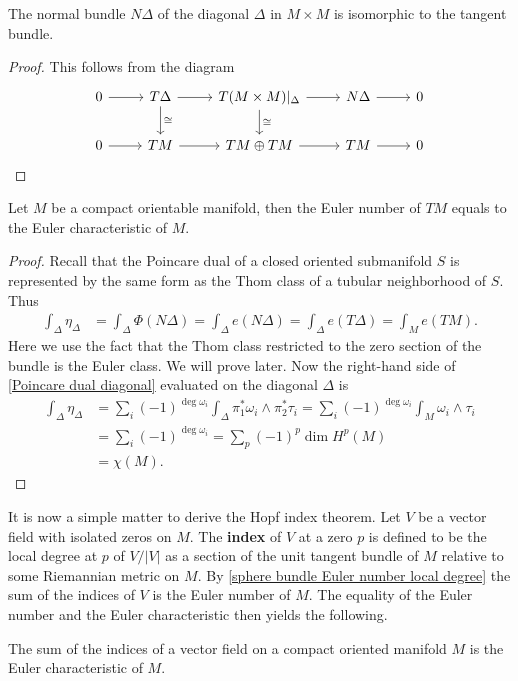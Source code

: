 \begin{lemma}
The normal bundle $N\Delta$ of the diagonal $\Delta$ in $M\times M$ is isomorphic to the tangent bundle.
\end{lemma}
\begin{proof}
This follows from the diagram
\[\begin{tikzcd}
0\ar[r]&T\Delta\ar[r]\ar[d,"\cong"]&T(M\times M)|_{\Delta}\ar[r]\ar[d,"\cong"]&N\Delta\ar[r]&0\\
0\ar[r]&TM\ar[r]&TM\oplus TM\ar[r]&TM\ar[r]&0
\end{tikzcd}\]
\end{proof}
\begin{theorem}\label{Euler number Euler char}
Let $M$ be a compact orientable manifold, then the Euler number of $TM$ equals to the Euler characteristic of $M$.
\end{theorem}
\begin{proof}
Recall that the Poincare dual of a closed oriented submanifold $S$ is represented by the same form as the Thom class of a tubular neighborhood of $S$. Thus
\begin{align*}
\int_{\Delta}\eta_{\Delta}&=\int_{\Delta}\Phi(N\Delta)=\int_{\Delta}e(N\Delta)=\int_{\Delta}e(T\Delta)=\int_Me(TM).
\end{align*}
Here we use the fact that the Thom class restricted to the zero section of the bundle is the Euler class. We will prove later. Now the right-hand side of 
\cref{Poincare dual diagonal} evaluated on the diagonal $\Delta$ is
\begin{align*}
\int_\Delta\eta_{\Delta}&=\sum_i(-1)^{\deg\omega_i}\int_{\Delta}\pi_1^*\omega_i\wedge\pi_2^*\tau_i=\sum_i(-1)^{\deg\omega_i}\int_{M}\omega_i\wedge\tau_i\\
&=\sum_i(-1)^{\deg\omega_i}=\sum_p(-1)^p\dim H^p(M)\\
&=\chi(M).
\end{align*}
\end{proof}
It is now a simple matter to derive the Hopf index theorem. Let $V$ be a vector field with isolated zeros on $M$. The \textbf{index} of $V$ at a zero $p$ is defined to 
be the local degree at $p$ of $V/|V|$ as a section of the unit tangent bundle of $M$ relative to some Riemannian metric on $M$. By \cref{sphere bundle Euler number local degree} 
the sum of the indices of $V$ is the Euler number of $M$. The equality of the Euler number and the Euler characteristic then yields the following.
\begin{theorem}
The sum of the indices of a vector field on a compact oriented manifold $M$ is the Euler characteristic of $M$.
\end{theorem}
